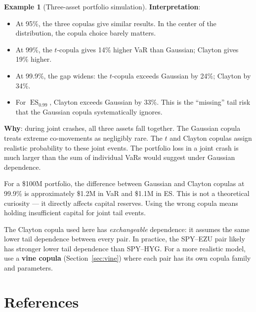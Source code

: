 \documentclass[11pt, a4paper]{article}
\theoremstyle{definition}
\newtheorem{example}{Example}[section]
\theoremstyle{plain}
\theoremstyle{remark}
\newcommand{\ES}{\operatorname{ES}}
\begin{document}
\begin{example}[Three-asset portfolio simulation]
\medskip
\textbf{Interpretation}:
\begin{itemize}
    \item At 95\%, the three copulas give similar results.
          In the center of the distribution, the copula choice barely matters.
    \item At 99\%, the $t$-copula gives 14\% higher VaR than Gaussian; Clayton gives 19\% higher.
    \item At 99.9\%, the gap widens: the $t$-copula exceeds Gaussian by 24\%; Clayton by 34\%.
    \item For $\ES_{0.99}$, Clayton exceeds Gaussian by 33\%.
          This is the ``missing'' tail risk that the Gaussian copula systematically ignores.
\end{itemize}

\textbf{Why}: during joint crashes, all three assets fall together.
The Gaussian copula treats extreme co-movements as negligibly rare.
The $t$ and Clayton copulas assign realistic probability to these joint events.
The portfolio loss in a joint crash is much larger than the sum of individual VaRs
would suggest under Gaussian dependence.
\end{example}

\begin{keyresult}
For a \$100M portfolio, the difference between Gaussian and Clayton copulas at 99.9\%
is approximately \$1.2M in VaR and \$1.1M in ES.
This is not a theoretical curiosity --- it directly affects capital reserves.
Using the wrong copula means holding insufficient capital for joint tail events.
\end{keyresult}

\begin{warningbox}
The Clayton copula used here has \emph{exchangeable} dependence:
it assumes the same lower tail dependence between every pair.
In practice, the SPY--EZU pair likely has stronger lower tail dependence than SPY--HYG.
For a more realistic model, use a \textbf{vine copula} (Section~\ref{sec:vine})
where each pair has its own copula family and parameters.
\end{warningbox}

\section{References}
\label{sec:references}
\end{document}
